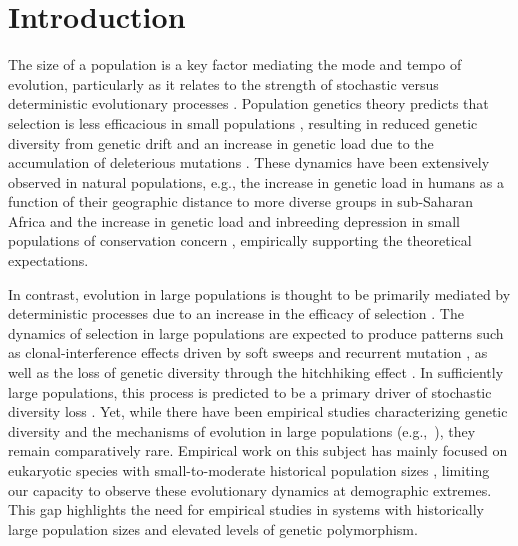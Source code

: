 \section*{Introduction}

The size of a population is a key factor mediating the mode and tempo of evolution,
particularly as it relates to the strength of stochastic versus deterministic
evolutionary processes \citep{kimura_mutation_1963,gillespie_genetic_2000}.
Population genetics theory predicts that selection is less efficacious in small populations
\citep{charlesworth_effective_2009,gravel_when_2016}, resulting in reduced genetic
diversity from genetic drift and an increase in genetic load due to the accumulation
of deleterious mutations \citep{lande_risk_1994,lynch_mutation_1995,dussex_purging_2023}.
These dynamics have been extensively observed in natural populations, e.g., the
increase in genetic load in humans as a function of their geographic distance to more
diverse groups in sub-Saharan Africa \citep{henn_distance_2016} and the increase in
genetic load and inbreeding depression in small populations of conservation concern
\citep{lande_genetics_1988,westemeier_prairiechicken_1998,frankham_genetics_2005,
kardos_inbreeding_2023}, empirically supporting the theoretical expectations.
\vspace{0.1cm}

In contrast, evolution in large populations is thought to be primarily mediated by
deterministic processes due to an increase in the efficacy of selection
\citep{charlesworth_effective_2009,gravel_when_2016,lanfear_population_2014}.
The dynamics of selection in large populations are expected to produce patterns
such as clonal-interference effects driven by soft sweeps and recurrent mutation
\citep{park_clonal_2007,weissman_rate_2014}, as well as the loss of genetic
diversity through the hitchhiking effect \citep{smith_hitch-hiking_1974}.
In sufficiently large populations, this process is predicted to be a primary driver
of stochastic diversity loss \citep{gillespie_genetic_2000,gillespie_role_1999}.
Yet, while there have been empirical studies characterizing genetic diversity and the
mechanisms of evolution in large populations (e.g.,~\citealp{dey_molecular_2013,ag1000g,
teterina_pervasive_2025,anderson_population_2017, braso-vives_highly_2026}),
they remain comparatively rare.
Empirical work on this subject has mainly focused on eukaryotic species with
small-to-moderate historical population sizes \citep{cutter_molecular_2013,
leffler_revisiting_2012,buffalo_quantifying_2021}, limiting our capacity to observe
these evolutionary dynamics at demographic extremes.
This gap highlights the need for empirical studies in systems with historically large
population sizes and elevated levels of genetic polymorphism.
\vspace{0.1cm}

